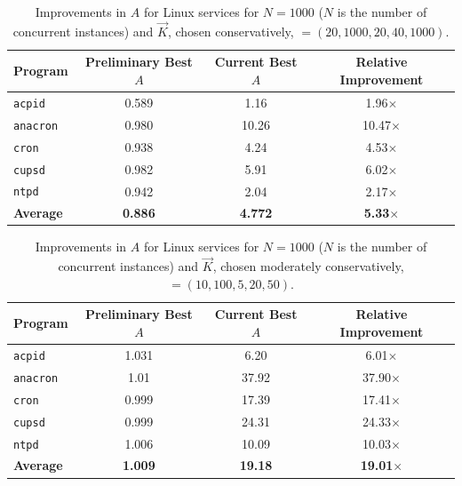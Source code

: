 \begin{table} [h]
\begin{center}
\begin{tabular}{|l||c|c||c||}\hline
  Program & Preliminary Best $A$ & Current Best $A$ & Relative Improvement \\\hline \hline
  \texttt{acpid} & 0.589 & 1.16 & 1.96$\times$  \\\hline  
  \texttt{anacron} & 0.980 & 10.26 & 10.47$\times$  \\\hline  
  \texttt{cron} & 0.938 & 4.24 & 4.53$\times$  \\\hline
  \texttt{cupsd} & 0.982 & 5.91 & 6.02$\times$  \\\hline
  \texttt{ntpd} & 0.942 & 2.04 & 2.17$\times$  \\\hline \hline 
  \textbf{Average} & \textbf{0.886} & \textbf{4.772} & {\bf 5.33$\times$}  \\\hline
\end{tabular}
\caption{Improvements in $A$ for Linux services
  for $N = 1000$ ($N$ is the number of concurrent instances) and $\vec K$, 
  chosen conservatively, $ = (20, 1000, 20, 40, 1000)$.}
\label{evalsummarytbl1}
\end{center}
\end{table}

\begin{table} [h]
\begin{center}
\begin{tabular}{|l||c|c||c||}\hline
  Program & Preliminary Best $A$ & Current Best $A$ & Relative Improvement \\\hline \hline
  \texttt{acpid} & 1.031 & 6.20 & 6.01$\times$  \\\hline  
  \texttt{anacron} & 1.01 & 37.92 & 37.90$\times$  \\\hline  
  \texttt{cron} & 0.999 & 17.39 & 17.41$\times$  \\\hline
  \texttt{cupsd} & 0.999 & 24.31 & 24.33$\times$  \\\hline
  \texttt{ntpd} & 1.006 & 10.09 & 10.03$\times$  \\\hline \hline 
  \textbf{Average} & \textbf{1.009} & \textbf{19.18} & {\bf 19.01$\times$}  \\\hline
\end{tabular}
\caption{Improvements in $A$ for Linux services
  for $N = 1000$ ($N$ is the number of concurrent instances) and $\vec K$, 
  chosen moderately conservatively, $ = (10, 100, 5, 20, 50)$.}
\label{evalsummarytbl2}
\end{center}
\end{table}

